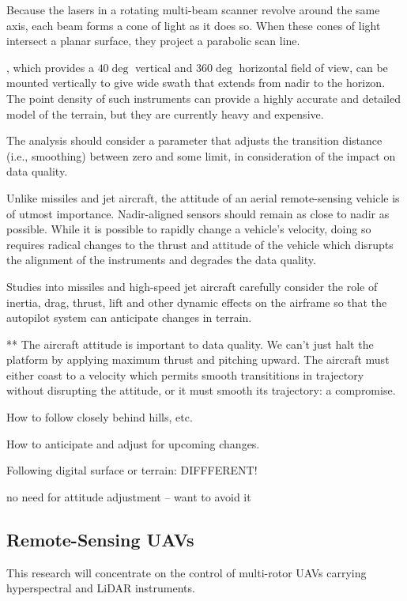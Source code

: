 \documentclass[10pt,a4paper]{report}
\begin{document}
Because the lasers in a rotating multi-beam scanner revolve around the same axis, each beam forms a cone of light as it does so. When these cones of light intersect a planar surface, they project a parabolic scan line.

, which provides a $40\deg$ vertical and $360\deg$ horizontal field of view, can be mounted vertically to give wide swath that extends from nadir to the horizon. The point density of such instruments can provide a highly accurate and detailed model of the terrain, but they are currently heavy and expensive. 


The analysis should consider a parameter that adjusts the transition distance (i.e., smoothing) between zero and some limit, in consideration of the impact on data quality.

Unlike missiles and jet aircraft, the attitude of an aerial remote-sensing vehicle is of utmost importance. Nadir-aligned sensors should remain as close to nadir as possible. While it is possible to rapidly change a vehicle's velocity, doing so requires radical changes to the thrust and attitude of the vehicle which disrupts the alignment of the instruments and degrades the data quality.



Studies into missiles and high-speed jet aircraft carefully consider the role of inertia, drag, thrust, lift and other dynamic effects on the airframe so that the autopilot system can anticipate changes in terrain. 

** The aircraft attitude is important to data quality. We can't just halt the platform by applying maximum thrust and pitching upward. The aircraft must either coast to a velocity which permits smooth transititions in trajectory without disrupting the attitude, or it must smooth its trajectory: a compromise.



How to follow closely behind hills, etc. 

How to anticipate and adjust for upcoming changes.

Following digital surface or terrain: DIFFFERENT!

no need for attitude adjustment -- want to avoid it




\subsection{Remote-Sensing UAVs}

This research will concentrate on the control of multi-rotor UAVs carrying hyperspectral and LiDAR instruments.
\end{document}
